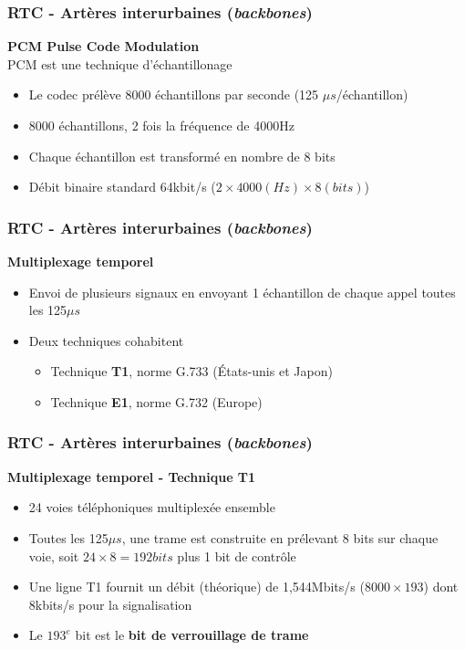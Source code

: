 \begin{frame}[fragile]
	\frametitle{RTC - Artères interurbaines (\textit{backbones})}
{\large\bf PCM Pulse Code Modulation} \\
PCM est une technique d'échantillonage
\begin{itemize}
	\item Le codec prélève 8000 échantillons par seconde
	(125 $\mu s$/échantillon)
	\item 8000 échantillons, 2 fois la fréquence de 4000Hz
	\item Chaque échantillon est transformé en nombre de 8 bits
	\item Débit binaire standard 64kbit/s ($2\times4000(Hz)\times8(bits)$)
\end{itemize}
\end{frame}

\begin{frame}[fragile]
	\frametitle{RTC - Artères interurbaines (\textit{backbones})}
{\large\bf Multiplexage temporel}
\begin{itemize}
	\item Envoi de plusieurs signaux en envoyant 1 échantillon de chaque appel toutes les 125$\mu s$
	\item Deux techniques cohabitent
	\begin{itemize}
		\item Technique \textbf{T1}, norme G.733 (États-unis et Japon)
		\item Technique \textbf{E1}, norme G.732 (Europe)
	\end{itemize}
\end{itemize}
\end{frame}

\begin{frame}[fragile]
  \frametitle{RTC - Artères interurbaines (\textit{backbones})}
{\large\bf Multiplexage temporel - Technique T1}
\begin{itemize}
	\item 24 voies téléphoniques multiplexée ensemble
	\item Toutes les 125$\mu s$, une trame est construite en prélevant 8 bits
	sur chaque voie, soit $24\times 8 = 192 bits$ plus 1 bit de contrôle
	\item Une ligne T1 fournit un débit (théorique) de 1,544Mbits/s ($8000\times
	193$) dont 8kbits/s pour la signalisation
	\item Le $193^e$ bit est le \textbf{bit de verrouillage de trame}
\end{itemize}
\end{frame}

